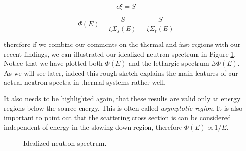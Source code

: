 $$c\xi=S$$

$$\Phi(E)=\frac{S}{\xi\Sigma_s(E)}=\frac{S}{\xi\Sigma_t(E)}$$

\noindent therefore if we combine our comments on the thermal and fast regions with our recent findings, we can illustrated our idealized neutron spectrum in Figure \ref{fig:idealneutronspectrum}. Notice that we have plotted both $\Phi(E)$ and the lethargic spectrum $E\Phi(E)$. As we will see later, indeed this rough sketch explains the main features of our actual neutron spectra in thermal systems rather well.

It also needs to be highlighted again, that these results are valid only at energy regions below the source energy. This is often called \textit{asymptotic region}. It is also important to point out that the scattering cross section is can be considered independent of energy in the slowing down region, therefore $\Phi(E)\propto 1/E$.

\begin{figure}[ht!]
\protect {}\protect
\caption{\label{fig:idealneutronspectrum} \footnotesize{Idealized neutron spectrum.}}
\end{figure}

